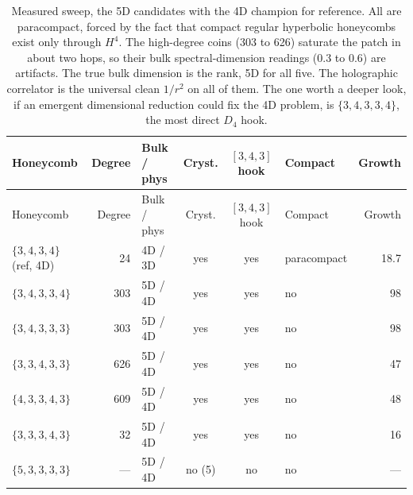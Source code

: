 {\small
\begin{longtable}{l r l c c p{0.9in} r}
\caption{Measured sweep, the 5D candidates with the 4D champion for reference. All are paracompact, forced by the
fact that compact regular hyperbolic honeycombs exist only through $H^4$. The high-degree coins (303 to 626)
saturate the patch in about two hops, so their bulk spectral-dimension readings (0.3 to 0.6) are artifacts. The
true bulk dimension is the rank, 5D for all five. The holographic correlator is the universal clean $1/r^2$ on
all of them. The one worth a deeper look, if an emergent dimensional reduction could fix the 4D problem, is
$\{3,4,3,3,4\}$, the most direct $D_4$ hook.}
\label{tab:sweep-5d}\\
\toprule
Honeycomb & Degree & Bulk / phys & Cryst. & $[3,4,3]$ hook & Compact & Growth \\
\midrule
\endfirsthead
\toprule
Honeycomb & Degree & Bulk / phys & Cryst. & $[3,4,3]$ hook & Compact & Growth \\
\midrule
\endhead
\bottomrule
\endfoot
$\{3,4,3,4\}$ (ref, 4D) & 24 & 4D / 3D & yes & yes & paracompact & 18.7 \\
$\{3,4,3,3,4\}$ & 303 & 5D / 4D & yes & yes & no & 98 \\
$\{3,4,3,3,3\}$ & 303 & 5D / 4D & yes & yes & no & 98 \\
$\{3,3,4,3,3\}$ & 626 & 5D / 4D & yes & yes & no & 47 \\
$\{4,3,3,4,3\}$ & 609 & 5D / 4D & yes & yes & no & 48 \\
$\{3,3,3,4,3\}$ & 32 & 5D / 4D & yes & yes & no & 16 \\
$\{5,3,3,3,3\}$ & --- & 5D / 4D & no (5) & no & no & --- \\
\end{longtable}}
